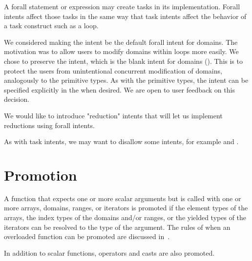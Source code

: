 \begin{rationale}
A forall statement or expression may create tasks in its implementation.
Forall intents affect those tasks in the same way that task intents
affect the behavior of a task construct such as a  loop.
\end{rationale}

\begin{rationale}
We considered making the  intent be the default forall intent
for domains.  The motivation was to allow users to modify domains
within  loops more easily.  We chose to preserve the
 intent, which is the blank intent for domains
().  This is to protect the users from
unintentional concurrent modification of domains, analogously to the
primitive types. As with the primitive types, the  intent
can be specified explicitly in the  when desired.
%
We are open to user feedback on this decision.
\end{rationale}

\begin{future}
We would like to introduce "reduction" intents
that will let us implement reductions using forall intents.
\end{future}

\begin{future}
As with task intents, we may want to disallow some intents,
for example  and .
\end{future}


\section{Promotion}
\label{Promotion}

A function that expects one or more scalar arguments but is called
with one or more arrays, domains, ranges, or iterators is promoted if
the element types of the arrays, the index types of the domains and/or
ranges, or the yielded types of the iterators can be resolved to the
type of the argument.  The rules of when an overloaded function can be
promoted are discussed in~.

In addition to scalar functions, operators and casts are also
promoted.

